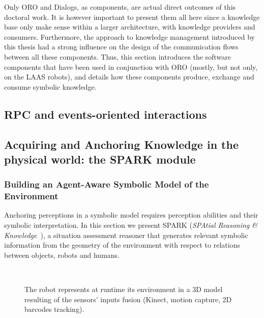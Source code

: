 Only ORO and Dialogs, as components, are actual direct outcomes of this
doctoral work. It is however important to present them all here since a
knowledge base only make sense within a larger architecture, with knowledge
providers and consumers.  Furthermore, the approach to knowledge management
introduced by this thesis had a strong influence on the design of the
communication flows between all these components. Thus, this section introduces
the software components that have been used in conjunction with ORO (mostly,
but not only, on the LAAS robots), and details how these components produce,
exchange and consume symbolic knowledge.

\subsection{RPC and events-oriented interactions}

\subsection{Acquiring and Anchoring Knowledge in the physical world: the SPARK module}

\subsubsection{Building an Agent-Aware Symbolic Model of the Environment}
\label{sect|situ}

Anchoring perceptions in a symbolic model requires perception abilities and
their symbolic interpretation. In this section we present SPARK (\emph{SPAtial
Reasoning \& Knowledge}~\cite{Sisbot2011}), a situation assessment reasoner
that generates relevant symbolic information from the geometry of the
environment with respect to relations between objects, robots and humans.

\begin{figure}[ht!]
   \begin{center}
%
       \\ %
%
   \end{center}

   \caption{The robot represents at runtime its environment in a 3D model
   resulting of the sensors' inputs fusion (Kinect, motion capture, 2D barcodes
   tracking).}

   \label{fig|spark}

\end{figure}

